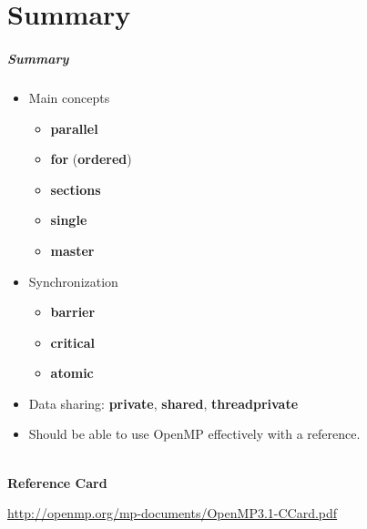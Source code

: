 \documentclass[aspectratio=43]{beamer}
\newenvironment{changemargin}[1]{%
  \begin{list}{}{%
    \setlength{\topsep}{0pt}%
    \setlength{\leftmargin}{#1}%
    \setlength{\rightmargin}{1em}
    \setlength{\listparindent}{\parindent}%
    \setlength{\itemindent}{\parindent}%
    \setlength{\parsep}{\parskip}%
  }%
  \item[]}{\end{list}}
\begin{document}
\part{Summary}
\frame{\partpage}
\begin{frame}[fragile]
  \frametitle{Summary}

  \begin{changemargin}{1.5cm}
  \begin{itemize}
    \item Main concepts
      \begin{itemize}
        \item {\bf parallel}
        \item {\bf for} ({\bf ordered})
        \item {\bf sections}
        \item {\bf single}
        \item {\bf master}
      \end{itemize}
    \item Synchronization
      \begin{itemize}
        \item {\bf barrier}
        \item {\bf critical}
        \item {\bf atomic}
      \end{itemize}
    \item Data sharing: {\bf private}, {\bf shared}, {\bf threadprivate}
    \item Should be able to use OpenMP effectively with a reference.
  \end{itemize}~\\

  {\bf Reference Card}

  \url{http://openmp.org/mp-documents/OpenMP3.1-CCard.pdf}
  \end{changemargin}

\end{frame}



\end{document}
